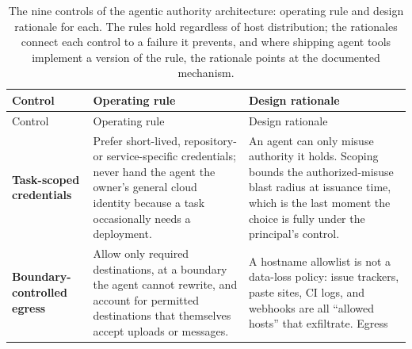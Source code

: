 \documentclass[
  english,
  9pt,
]{extarticle}
\begin{document}
\begin{longtable}[]{@{}
  >{\raggedright\arraybackslash}p{}
  >{\raggedright\arraybackslash}p{}
  >{\raggedright\arraybackslash}p{}@{}}
\caption{The nine controls of the agentic authority architecture:
operating rule and design rationale for each. The rules hold regardless
of host distribution; the rationales connect each control to a failure
it prevents, and where shipping agent tools implement a version of the
rule, the rationale points at the documented
mechanism.}\label{tbl:controls}\tabularnewline
\toprule\noalign{}
\begin{minipage}[b]{\linewidth}\raggedright
Control
\end{minipage} & \begin{minipage}[b]{\linewidth}\raggedright
Operating rule
\end{minipage} & \begin{minipage}[b]{\linewidth}\raggedright
Design rationale
\end{minipage} \\
\midrule\noalign{}
\endfirsthead
\toprule\noalign{}
\begin{minipage}[b]{\linewidth}\raggedright
Control
\end{minipage} & \begin{minipage}[b]{\linewidth}\raggedright
Operating rule
\end{minipage} & \begin{minipage}[b]{\linewidth}\raggedright
Design rationale
\end{minipage} \\
\midrule\noalign{}
\endhead
\bottomrule\noalign{}
\endlastfoot
\textbf{Task-scoped credentials} & Prefer short-lived, repository- or
service-specific credentials; never hand the agent the owner's general
cloud identity because a task occasionally needs a deployment. & An
agent can only misuse authority it holds. Scoping bounds the
authorized-misuse blast radius at issuance time, which is the last
moment the choice is fully under the principal's control. \\
\textbf{Boundary-controlled egress} & Allow only required destinations,
at a boundary the agent cannot rewrite, and account for permitted
destinations that themselves accept uploads or messages. & A hostname
allowlist is not a data-loss policy: issue trackers, paste sites, CI
logs, and webhooks are all ``allowed hosts'' that exfiltrate. Egress

\end{longtable}
\end{document}
